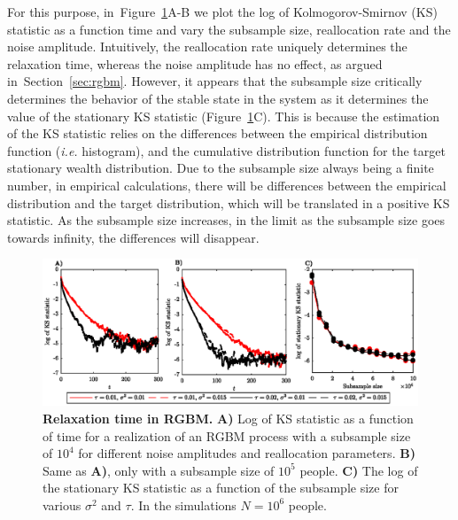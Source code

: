 \documentclass[11pt]{article}
\newcommand{\Sref}[1]{Section~\ref{sec:#1}}
\newcommand{\ie}{{\it i.e.}\xspace}
\newcommand{\Fref}[1]{Figure~\ref{fig:#1}}
\numberwithin{equation}{section}
\begin{document}
For this purpose, in~\Fref{rgbm-mixing-time}A-B we plot the log of Kolmogorov-Smirnov (KS) statistic as a function time and vary the subsample size, reallocation rate and the noise amplitude. Intuitively, the reallocation rate uniquely determines the relaxation time, whereas the noise amplitude has no effect, as argued in~\Sref{rgbm}. However, it appears that the subsample size critically determines the behavior of the stable state in the system as it determines the value of the stationary KS statistic (\Fref{rgbm-mixing-time}C). This is because the estimation of the KS statistic relies on the differences between the empirical distribution function (\ie histogram), and the cumulative distribution function for the target stationary wealth distribution. Due to the subsample size always being a finite number, in empirical calculations, there will be differences between the empirical distribution and the target distribution, which will be translated in a positive KS statistic. As the subsample size increases, in the limit as the subsample size goes towards infinity, the differences will disappear.

\begin{figure}[!htb]
\centering
\includegraphics[width=1.0\textwidth]{figs/fig_mixing_time_rgbm.eps}
\caption{\textbf{Relaxation time in RGBM.} \textbf{A)} Log of KS statistic as a function of time for a realization of an RGBM process with a subsample size of $10^4$ for different noise amplitudes and reallocation parameters. \textbf{B)} Same as \textbf{A)}, only with a subsample size of $10^5$ people. \textbf{C)} The log of the stationary KS statistic as a function of the subsample size for various $\sigma^2$ and $\tau$. In the simulations $N = 10^6$ people. \label{fig:rgbm-mixing-time}}
\end{figure}
\end{document}
